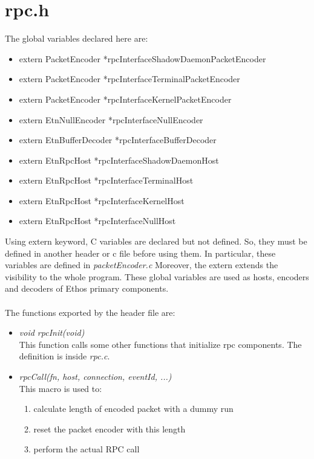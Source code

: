\section{rpc.h}

The global variables declared here are:
\begin{itemize}
\item extern PacketEncoder *rpcInterfaceShadowDaemonPacketEncoder
\item extern PacketEncoder *rpcInterfaceTerminalPacketEncoder
\item extern PacketEncoder *rpcInterfaceKernelPacketEncoder
\item extern EtnNullEncoder *rpcInterfaceNullEncoder
\item extern EtnBufferDecoder *rpcInterfaceBufferDecoder
\item extern EtnRpcHost *rpcInterfaceShadowDaemonHost
\item extern EtnRpcHost *rpcInterfaceTerminalHost
\item extern EtnRpcHost *rpcInterfaceKernelHost
\item extern EtnRpcHost *rpcInterfaceNullHost
\end{itemize}

Using extern keyword, C variables are declared but not defined. So, they must be defined in another header or c file before using them. In particular, these variables are defined in \emph{packetEncoder.c}
Moreover, the extern extends the visibility to the whole program. These global variables are used as hosts, encoders and decoders of Ethos primary components.\\\\
The functions exported by the header file are:

\begin{itemize}
\item \emph{void rpcInit(void)}\\
This function calls some other functions that initialize rpc components. The definition is inside \emph{rpc.c}.

\item \emph{rpcCall(fn, host, connection, eventId, ...)}\\
This macro is used to: 
\begin{enumerate}

\item calculate length of encoded packet with a dummy run
\item reset the packet encoder with this length
\item perform the actual RPC call

\end{enumerate}

\end{itemize}